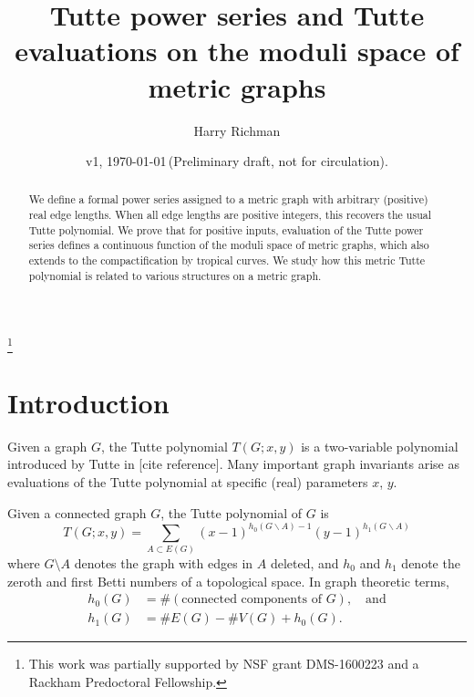 \documentclass{amsart}
\theoremstyle{definition}
\begin{document}
\title[Tutte power series on metric graphs]{Tutte power series and Tutte evaluations on the moduli space of metric graphs}
\author{Harry Richman}
\date{v1, \today  \,(Preliminary draft, not for circulation).}
\thanks{This work was partially supported by NSF grant DMS-1600223
and a Rackham Predoctoral Fellowship.}


\begin{abstract}
We define a formal power series assigned to a metric graph with arbitrary
(positive) real edge lengths.
When all edge lengths are positive integers,
this recovers the usual Tutte polynomial.
We prove that for positive inputs, evaluation of the Tutte power series
defines a continuous function of the moduli space of metric graphs,
which also extends to the compactification by tropical curves.
We study how this metric Tutte polynomial is
related to various structures on a metric graph.
\end{abstract}
\maketitle


\section{Introduction}
Given a graph $G$,
the Tutte polynomial $T(G;x,y)$ 
is 
 a two-variable polynomial %
introduced by Tutte in [cite reference].
Many important graph invariants arise as evaluations of 
the Tutte polynomial %
at specific (real) parameters $x$, $y$.

Given a connected graph $G $, 
the Tutte polynomial of $G$ is 
\begin{equation}
\label{eq:tutte-graph}
T(G; x,y) = \sum_{A \subset E(G)} (x-1)^{h_0(G\backslash A) - 1}(y-1)^{h_1(G\backslash A)}
\end{equation}
where $G\setminus A$ denotes the graph with edges in $A$ deleted,
and $h_0$ and $h_1$ denote the zeroth and first Betti numbers of 
a topological space.
In graph theoretic terms,
\begin{align*}
h_0(G) &= \#(\text{connected components of }G), \quad\text{and}\\
h_1(G) &= \# E(G) - \# V(G) + h_0(G) .
\end{align*}
\end{document}
